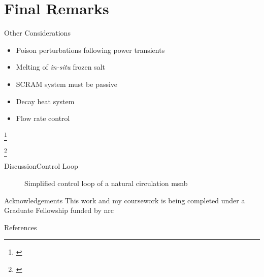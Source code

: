 \documentclass[aspectratio=1610,pdftex,dvipsnames]{beamer}
\newcommand\blfootnote[1]{%
  \begingroup
  \renewcommand\thefootnote{}\footnote{#1}%
  \addtocounter{footnote}{-1}%
  \endgroup
}
\newcommand{\acf}{\acrfull} %
\newcommand{\acs}{\acrshort} %
\begin{document}
\section{Final Remarks}
\begin{frame}{Other Considerations}
    \begin{itemize}
        \item Poison perturbations following power transients \cite{Roberson}
        \item Melting of \textit{in-situ} frozen salt
        \item SCRAM system must be passive
        \item Decay heat system \cite{DecayHeat}
        \item Flow rate control
    \end{itemize}

    \blfootnote{\tiny\cite{Roberson} \tiny{}}
    \blfootnote{\tiny\cite{DecayHeat} \tiny{}}
\end{frame}

\begin{frame}{Discussion}{Control Loop}

        \begin{figure}[!ht]
            \centering
            
            \caption{Simplified control loop of a natural circulation \acs{msnb}}
            \label{fig:SimpleControlLoop}
        \end{figure}
    
\end{frame}

\begin{frame}{Acknowledgements}
    \centering
    This work and my coursework is being completed under a Graduate Fellowship funded by \acf{nrc}
\end{frame}


\begin{frame}{References}
    
    \footnotesize
    
\end{frame}
\end{document}
